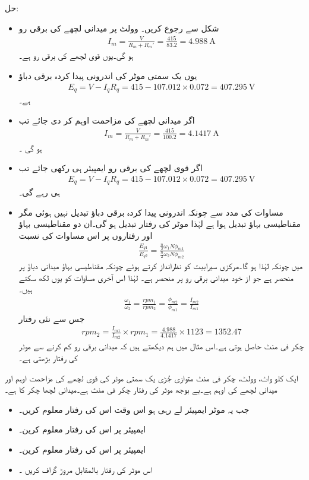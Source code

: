 حل:
\begin{itemize}
\item
شکل  سے رجوع کریں۔ وولٹ پر میدانی لچھے کی برقی رو
\begin{align*}
I_m=\tfrac{V}{R_m+R_m'}=\frac{415}{83.2}=\SI{4.988}{\ampere}
\end{align*}
ہو گی۔یوں قوی لچھے کی برقی رو  ہے۔
\item
یوں یک سمتی موٹر کی اندرونی پیدا کردہ برقی دباؤ
\begin{align*}
E_q=V-I_q R_q=415-107.012\times 0.072=\SI{407.295}{\volt}
\end{align*}
ہے۔
\item
اگر میدانی لچھے کی مزاحمت  اوہم کر دی جائے  تب
\begin{align*}
I_m=\frac{V}{R_m+R_m'}=\frac{415}{100.2}=\SI{4.1417}{\ampere}
\end{align*}
ہو گی ۔
\item
اگر قوی لچھے کی برقی رو  ایمپیئر ہی رکھی جائے تب 
\begin{align*}
E_q=V-I_q R_q=415-107.012 \times 0.072=\SI{407.295}{\volt}
\end{align*}
ہی رہے گی۔
\item
مساوات  کی مدد سے  چونکہ اندرونی پیدا کردہ برقی دباؤ تبدیل نہیں ہوئی مگر مقناطیسی بہاؤ تبدیل ہوا ہے لہٰذا موٹر کی رفتار تبدیل ہو گی۔ان دو مقناطیسی بہاؤ اور رفتاروں پر اس مساوات کی نسبت
\begin{align*}
\frac{E_{q1}}{E_{q2}}=\frac{\frac{n}{2} \omega_1 N \phi_{m1}}{\frac{n}{2} \omega_2 N \phi_{m2}}
\end{align*}
میں چونکہ  لہٰذا  ہو گا۔مرکزی سیرابیت کو نظرانداز کرتے ہوئے چونکہ مقناطیسی بہاؤ میدانی دباؤ پر منحصر ہے جو از خود میدانی برقی رو پر منحصر ہے۔ لہٰذا اس آخری مساوات کو یوں لکھ سکتے ہیں۔
\begin{align*}
\frac{\omega_1}{\omega_2}=\frac{rpm_1}{rpm_2}=\frac{\phi_{m2}}{\phi_{m1}}=\frac{I_{m2}}{I_{m1}}
\end{align*}
جس سے نئی رفتار
\begin{align*}
rpm_2=\frac{I_{m1}}{I_{m2}} \times rpm_1=\frac{4.988}{4.1417} \times 1123=1352.47
\end{align*}
چکر فی منٹ حاصل ہوتی ہے۔اس مثال میں ہم دیکھتے ہیں کہ میدانی برقی رو کم کرنے سے موٹر کی رفتار بڑھتی ہے۔
\end{itemize}
%
ایک  کلو واٹ،  وولٹ،  چکر فی منٹ متوازی جُڑی یک سمتی موٹر کی قوی لچھے کی مزاحمت  اوہم  اور میدانی لچھے کی   اوہم ہے۔بے بوجھ موٹر کی رفتار  چکر فی منٹ ہے۔میدانی لچھا  چکر کا ہے۔
\begin{itemize}
\item
جب یہ موٹر  ایمپیئر  لے رہی ہو اس وقت اس کی رفتار معلوم کریں۔
\item
{} ایمپیئر پر اس کی رفتار معلوم کرین۔
\item
{} ایمپیئر پر اس کی رفتار معلوم کرین۔
\item
اس موٹر کی رفتار بالمقابل مروڑ گراف کریں  ۔
\end{itemize}

